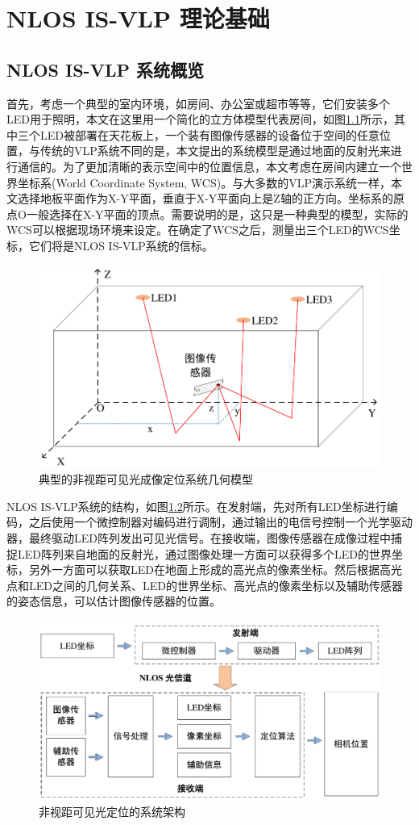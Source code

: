 \chapter{NLOS IS-VLP 理论基础}

\section{NLOS IS-VLP 系统概览}
首先，考虑一个典型的室内环境，如房间、办公室或超市等等，它们安装多个LED用于照明，本文在这里用一个简化的立方体模型代表房间，如图\ref{fig:typical model}所示，其中三个LED被部署在天花板上，一个装有图像传感器的设备位于空间的任意位置，与传统的VLP系统不同的是，本文提出的系统模型是通过地面的反射光来进行通信的。为了更加清晰的表示空间中的位置信息，本文考虑在房间内建立一个世界坐标系(World Coordinate System, WCS)。与大多数的VLP演示系统一样，本文选择地板平面作为X-Y平面，垂直于X-Y平面向上是Z轴的正方向。坐标系的原点O一般选择在X-Y平面的顶点。需要说明的是，这只是一种典型的模型，实际的WCS可以根据现场环境来设定。在确定了WCS之后，测量出三个LED的WCS坐标，它们将是NLOS IS-VLP系统的信标。
\begin{figure}[!htbp]
  \centering
  \includegraphics[width=0.7\linewidth]{FIG/system model.pdf}
  \caption{典型的非视距可见光成像定位系统几何模型}
  \label{fig:typical model}
\end{figure}

NLOS IS-VLP系统的结构，如图\ref{fig:system-architecture}所示。在发射端，先对所有LED坐标进行编码，之后使用一个微控制器对编码进行调制，通过输出的电信号控制一个光学驱动器，最终驱动LED阵列发出可见光信号。在接收端，图像传感器在成像过程中捕捉LED阵列来自地面的反射光，通过图像处理一方面可以获得多个LED的世界坐标，另外一方面可以获取LED在地面上形成的高光点的像素坐标。然后根据高光点和LED之间的几何关系、LED的世界坐标、高光点的像素坐标以及辅助传感器的姿态信息，可以估计图像传感器的位置。

\begin{figure}[!htbp]
  \centering
  \includegraphics[width=0.85\linewidth]{FIG/2-1-2-architecture.pdf}
  \caption{非视距可见光定位的系统架构}
  \label{fig:system-architecture}
\end{figure}

